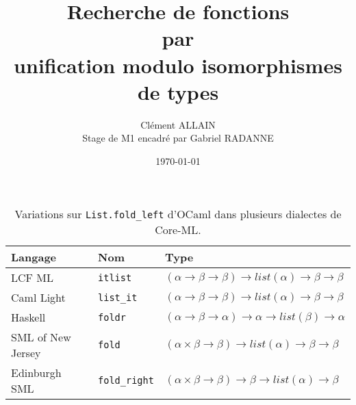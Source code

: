 \documentclass[serif]{beamer}
\title{Recherche de fonctions \\ par \\ unification modulo isomorphismes de types}
\author{Clément ALLAIN \\ Stage de M1 encadré par Gabriel RADANNE}
\date{\today}
\begin{document}

\begin{frame}
	\titlepage
\end{frame}


\begin{frame}
	\footnotesize
	\begin{table}[h]
		\centering
		\begin{tabular}{|l|l|l|}
			\hline
				Langage &
				Nom &
				Type
			\\
			\hline
				LCF ML &
				\texttt{itlist} &
				$(\alpha \rightarrow \beta \rightarrow \beta) \rightarrow list (\alpha) \rightarrow \beta \rightarrow \beta$
			\\
				Caml Light &
				\texttt{list\_it} &
				$(\alpha \rightarrow \beta \rightarrow \beta) \rightarrow list (\alpha) \rightarrow \beta \rightarrow \beta$
			\\
				Haskell &
				\texttt{foldr} &
				$(\alpha \rightarrow \beta \rightarrow \alpha) \rightarrow \alpha \rightarrow list (\beta) \rightarrow \alpha$
			\\
				SML of New Jersey &
				\texttt{fold} &
				$(\alpha \times \beta \rightarrow \beta) \rightarrow list (\alpha) \rightarrow \beta \rightarrow \beta$
			\\
				Edinburgh SML &
				\texttt{fold\_right} &
				$(\alpha \times \beta \rightarrow \beta) \rightarrow \beta \rightarrow list (\alpha) \rightarrow \beta$
			\\
			\hline
		\end{tabular}
		\caption{Variations sur \texttt{List.fold\_left} d'OCaml dans plusieurs dialectes de Core-ML.}
	\end{table}
\end{frame}

\end{document}
